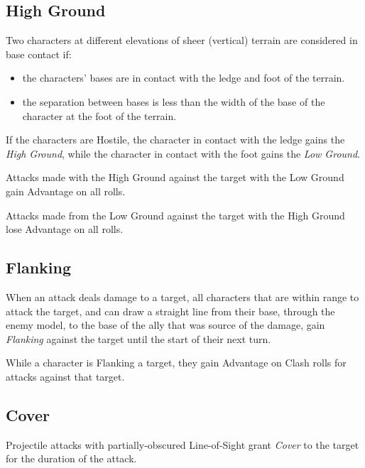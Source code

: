 \subsection{High Ground}
Two characters at different elevations of sheer (vertical) 
terrain are considered in base contact if:
\begin{itemize}
  \item the characters' bases are in contact with the ledge and 
    foot of the terrain.
  \item the separation between bases is less than the width of the 
    base of the character at the foot of the terrain.
\end{itemize}

If the characters are Hostile, 
the character in contact with the ledge gains the \textit{High Ground},
while the character in contact with the foot gains the \textit{Low Ground}.

\vspace{0.4em}

Attacks made with the High Ground against the target 
with the Low Ground gain Advantage on all rolls.

\vspace{0.4em}

Attacks made from the Low Ground against the target 
with the High Ground lose Advantage on all rolls.



\subsection{Flanking}
When an attack deals damage to a target, 
all characters that are within range to attack the target,
and can draw a straight line from their base, through the enemy model, 
to the base of the ally that was source of the damage, 
gain \textit{Flanking} against the target until the start of their next turn.

\vspace{0.4em}

While a character is Flanking a target, 
they gain Advantage on Clash rolls for attacks against that target.



\subsection{Cover}
Projectile attacks with partially-obscured Line-of-Sight grant \textit{Cover} 
to the target for the duration of the attack.

